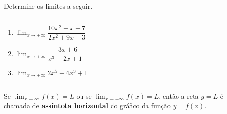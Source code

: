 \begin{frame}
  \begin{example}
    Determine os limites a seguir.
  \end{example}
  \begin{columns}[onlytextwidth]
    \begin{column}{0.5\textwidth}
      \begin{enumerate}
        \item $\displaystyle\lim_{x\rightarrow +\infty}\dfrac{10x^{2} - x + 7}{2x^{2} + 9x - 3}$\vspace*{1cm}
        \item $\displaystyle\lim_{x\rightarrow +\infty}\dfrac{- 3x + 6}{x^{3} + 2x + 1}$\vspace*{1cm}
        \item $\displaystyle\lim_{x\rightarrow +\infty} 2x^{5} - 4x^{3} + 1$
      \end{enumerate}
    \end{column}
    \begin{column}{0.5\textwidth}
    \end{column}
  \end{columns}
\end{frame}

\begin{frame}
  \begin{definition}
    Se $\displaystyle\lim_{x\rightarrow \infty}f(x)=L$ ou se $\displaystyle\lim_{x\rightarrow -\infty}f(x)=L$, então a reta $y=L$ é chamada de \textbf{assíntota horizontal} do gráfico da função $y=f(x)$.
  \end{definition}
  \begin{figure}
  \end{figure}
\end{frame}

